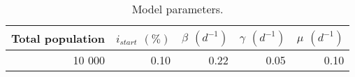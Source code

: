 \begin{table}[h!]
\centering
\caption{Model parameters.}
\label{tab:params}
\begin{tabular}{rrrrr}
\toprule
Total population & $i_{start}$ $(\%)$& $\beta $ $(d^{-1})$ & $\gamma $ $(d^{-1})$ & $\mu$ $(d^{-1})$\\
\midrule
        10 000 &             0.10 &   0.22 &    0.05 & 0.10\\
\bottomrule
\end{tabular}
\end{table}
